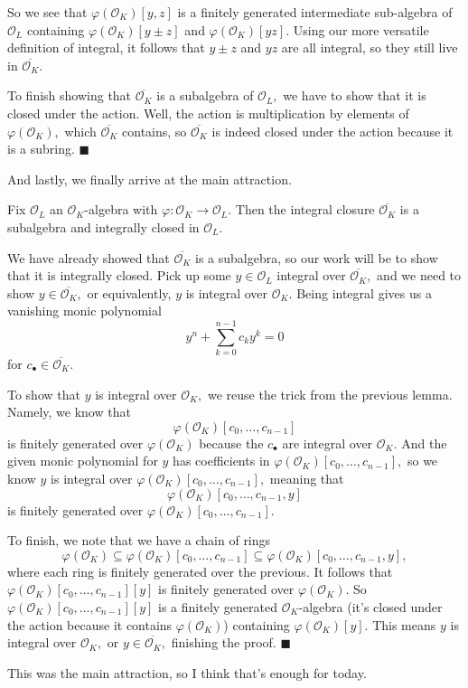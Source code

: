 So we see that $\varphi(\mathcal O_K)[y,z]$ is a finitely generated intermediate sub-algebra of $\mathcal O_L$ containing $\varphi(\mathcal O_K)[y\pm z]$ and $\varphi(\mathcal O_K)[yz].$ Using our more versatile definition of integral, it follows that $y\pm z$ and $yz$ are all integral, so they still live in $\overline{\mathcal O_K}.$

To finish showing that $\overline{\mathcal O_K}$ is a subalgebra of $\mathcal O_L,$ we have to show that it is closed under the action. Well, the action is multiplication by elements of $\varphi(\mathcal O_K),$ which $\overline{\mathcal O_K}$ contains, so $\overline{\mathcal O_K}$ is indeed closed under the action because it is a subring. $\blacksquare$

And lastly, we finally arrive at the main attraction.
\begin{theorem}
    Fix $\mathcal O_L$ an $\mathcal O_K$-algebra with $\varphi:\mathcal O_K\to\mathcal O_L.$ Then the integral closure $\overline{\mathcal O_K}$ is a subalgebra and integrally closed in $\mathcal O_L.$
\end{theorem}
We have already showed that $\overline{\mathcal O_K}$ is a subalgebra, so our work will be to show that it is integrally closed. Pick up some $y\in\mathcal O_L$ integral over $\overline{\mathcal O_K},$ and we need to show $y\in\overline{\mathcal O_K},$ or equivalently, $y$ is integral over $\mathcal O_K.$ Being integral gives us a vanishing monic polynomial
\[y^n+\sum_{k=0}^{n-1}c_ky^k=0\]
for $c_\bullet\in\overline{\mathcal O_K}.$

To show that $y$ is integral over $\mathcal O_K,$ we reuse the trick from the previous lemma. Namely, we know that
\[\varphi(\mathcal O_K)[c_0,\ldots,c_{n-1}]\]
is finitely generated over $\varphi(\mathcal O_K)$ because the $c_\bullet$ are integral over $\mathcal O_K.$ And the given monic polynomial for $y$ has coefficients in $\varphi(\mathcal O_K)[c_0,\ldots,c_{n-1}],$ so we know $y$ is integral over $\varphi(\mathcal O_K)[c_0,\ldots,c_{n-1}],$ meaning that
\[\varphi(\mathcal O_K)[c_0,\ldots,c_{n-1},y]\]
is finitely generated over $\varphi(\mathcal O_K)[c_0,\ldots,c_{n-1}].$

To finish, we note that we have a chain of rings
\[\varphi(\mathcal O_K)\subseteq\varphi(\mathcal O_K)[c_0,\ldots,c_{n-1}]\subseteq\varphi(\mathcal O_K)[c_0,\ldots,c_{n-1},y],\]
where each ring is finitely generated over the previous. It follows that $\varphi(\mathcal O_K)[c_0,\ldots,c_{n-1}][y]$ is finitely generated over $\varphi(\mathcal O_K).$ So $\varphi(\mathcal O_K)[c_0,\ldots,c_{n-1}][y]$ is a finitely generated $\mathcal O_K$-algebra (it's closed under the action because it contains $\varphi(\mathcal O_K)$) containing $\varphi(\mathcal O_K)[y].$ This means $y$ is integral over $\mathcal O_K,$ or $y\in\overline{\mathcal O_K},$ finishing the proof. $\blacksquare$

This was the main attraction, so I think that's enough for today.